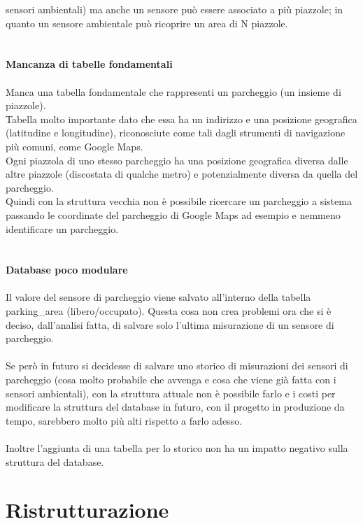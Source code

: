 sensori ambientali) ma anche un sensore può essere associato a più piazzole; in quanto un sensore ambientale
può ricoprire un area di N piazzole.
\\\\\\
\textbf{Mancanza di tabelle fondamentali}
\\\\
Manca una tabella fondamentale che rappresenti un parcheggio (un insieme di piazzole). 
\\
Tabella molto importante dato che essa ha un indirizzo e una posizione geografica (latitudine e longitudine), 
riconosciute come tali dagli strumenti di navigazione più comuni, come Google Maps. 
\\
Ogni piazzola di uno stesso parcheggio ha una posizione geografica diversa dalle altre piazzole (discostata di qualche 
metro) e potenzialmente diversa da quella del parcheggio. 
\\
Quindi con la struttura vecchia non è possibile ricercare un parcheggio a sistema passando le coordinate del parcheggio di Google
Maps ad esempio e nemmeno identificare un parcheggio.
\\\\\\
\textbf{Database poco modulare}
\\\\
Il valore del sensore di parcheggio viene salvato all'interno della tabella parking\_area (libero/occupato). Questa cosa non crea problemi ora che 
si è deciso, dall'analisi fatta, di salvare solo l'ultima misurazione di un sensore di parcheggio.
\\\\
Se però in futuro si decidesse di salvare uno storico di misurazioni dei sensori di parcheggio (cosa molto probabile che
avvenga e cosa che viene già fatta con i sensori ambientali), con la struttura attuale non è possibile farlo e i costi
per modificare la struttura del database in futuro, con il progetto in produzione da tempo, sarebbero molto più
alti rispetto a farlo adesso.
\\\\
Inoltre l'aggiunta di una tabella per lo storico non ha un impatto negativo sulla struttura del database.
\clearpage
\section{Ristrutturazione}

